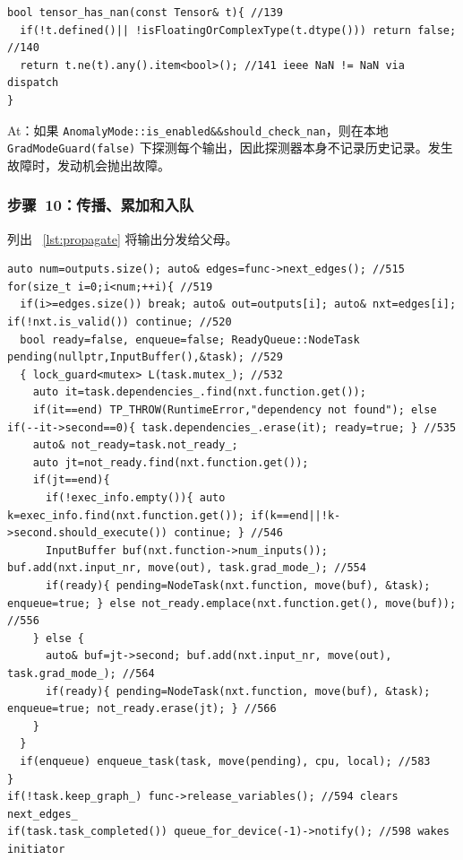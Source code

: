 \begin{lstlisting}[caption={NaN probe.}, label=lst:nanprobe]
bool tensor_has_nan(const Tensor& t){ //139
  if(!t.defined()|| !isFloatingOrComplexType(t.dtype())) return false; //140
  return t.ne(t).any().item<bool>(); //141 ieee NaN != NaN via dispatch
}
\end{lstlisting}

At：如果 \texttt{AnomalyMode::is\_enabled\&\&should\_check\_nan}，则在本地 \texttt{GradModeGuard(false)} 下探测每个输出，因此探测器本身不记录历史记录。发生故障时，发动机会抛出故障。

\subsubsection{步骤~10：传播、累加和入队}
\label{subsubsec:propagate}

列出 ~\ref{lst:propagate} 将输出分发给父母。

\begin{lstlisting}[caption={propagation.}, label=lst:propagate]
auto num=outputs.size(); auto& edges=func->next_edges(); //515
for(size_t i=0;i<num;++i){ //519
  if(i>=edges.size()) break; auto& out=outputs[i]; auto& nxt=edges[i]; if(!nxt.is_valid()) continue; //520
  bool ready=false, enqueue=false; ReadyQueue::NodeTask pending(nullptr,InputBuffer(),&task); //529
  { lock_guard<mutex> L(task.mutex_); //532
    auto it=task.dependencies_.find(nxt.function.get());
    if(it==end) TP_THROW(RuntimeError,"dependency not found"); else if(--it->second==0){ task.dependencies_.erase(it); ready=true; } //535
    auto& not_ready=task.not_ready_;
    auto jt=not_ready.find(nxt.function.get());
    if(jt==end){
      if(!exec_info.empty()){ auto k=exec_info.find(nxt.function.get()); if(k==end||!k->second.should_execute()) continue; } //546
      InputBuffer buf(nxt.function->num_inputs()); buf.add(nxt.input_nr, move(out), task.grad_mode_); //554
      if(ready){ pending=NodeTask(nxt.function, move(buf), &task); enqueue=true; } else not_ready.emplace(nxt.function.get(), move(buf)); //556
    } else {
      auto& buf=jt->second; buf.add(nxt.input_nr, move(out), task.grad_mode_); //564
      if(ready){ pending=NodeTask(nxt.function, move(buf), &task); enqueue=true; not_ready.erase(jt); } //566
    }
  }
  if(enqueue) enqueue_task(task, move(pending), cpu, local); //583
}
if(!task.keep_graph_) func->release_variables(); //594 clears next_edges_
if(task.task_completed()) queue_for_device(-1)->notify(); //598 wakes initiator
\end{lstlisting}

